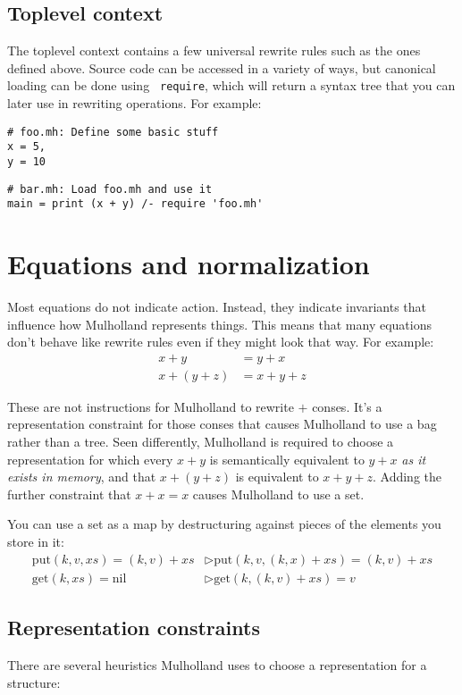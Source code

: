 \documentclass{report}
\begin{document}
\section{Toplevel context}
    The toplevel context contains a few universal rewrite rules such as the ones defined above. Source code can be accessed in a variety of ways, but canonical loading can be done using {\tt
    require}, which will return a syntax tree that you can later use in rewriting operations. For example:
\begin{verbatim}
# foo.mh: Define some basic stuff
x = 5,
y = 10
\end{verbatim}

\begin{verbatim}
# bar.mh: Load foo.mh and use it
main = print (x + y) /- require 'foo.mh'
\end{verbatim}

\chapter{Equations and normalization}
  Most equations do not indicate action. Instead, they indicate invariants that influence how Mulholland represents things. This means that many equations don't behave like rewrite rules even
  if they might look that way. For example:
\begin{align*}
x + y       & = y + x \\
x + (y + z) & = x + y + z
\end{align*}

  These are not instructions for Mulholland to rewrite $+$ conses. It's a representation constraint for those conses that causes Mulholland to use a bag rather than a tree. Seen differently,
  Mulholland is required to choose a representation for which every $x + y$ is semantically equivalent to $y + x$ {\em as it exists in memory}, and that $x + (y + z)$ is equivalent to $x + y +
  z$. Adding the further constraint that $x + x = x$ causes Mulholland to use a set.

  You can use a set as a map by destructuring against pieces of the elements you store in it:
\begin{align*}
\textrm{put}(k, v, xs) = (k, v) + xs  & \rhd \textrm{put}(k, v, (k, x) + xs) = (k, v) + xs \\
\textrm{get}(k, xs)    = \textrm{nil} & \rhd \textrm{get}(k, (k, v) + xs)    = v
\end{align*}

\section{Representation constraints}
    There are several heuristics Mulholland uses to choose a representation for a structure:
\end{document}
